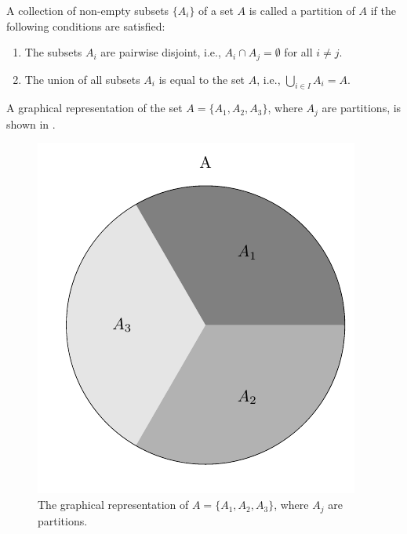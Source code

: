 \begin{definition}[Partition]
	\label{def:partition}
	A collection of non-empty subsets $\{A_i\}$ of a set $A$ is called a partition of $A$ if the following conditions are satisfied:
	\begin{enumerate}
		\item The subsets $A_i$ are pairwise disjoint, i.e., $A_i \cap A_j = \emptyset$ for all \(i \neq j\).
		\item The union of all subsets \(A_i\) is equal to the set \(A\), i.e., \(\bigcup_{i \in I} A_i = A\).
	\end{enumerate}
	
	A graphical representation of the set $A=\{A_1,A_2,A_3\}$, where $A_j$ are partitions, is shown in .
	\begin{figure}[h]
		\centering
		\includegraphics[]{figures/set_partition.pdf}
		\caption{The graphical representation of $A=\{A_1,A_2,A_3\}$, where $A_j$ are partitions.}
		\label{fig:set_partition}
	\end{figure}
\end{definition}
